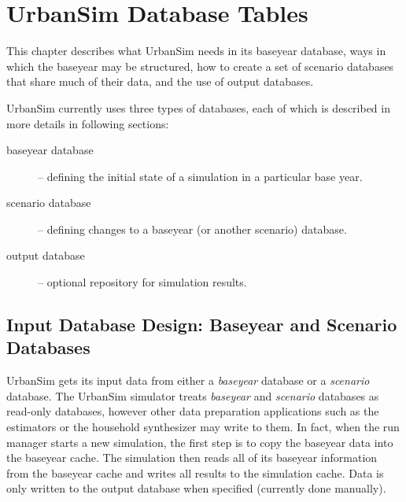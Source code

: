 
\chapter{UrbanSim Database Tables}
\label{chapter:urbansim-database-tables}


This chapter describes what UrbanSim needs in its baseyear database, ways in
which the baseyear may be structured, how to create a set of scenario databases
that share much of their data, and the use of output databases.

UrbanSim currently uses three types of databases, each of which is described in
more details in following sections:

\begin{description}
\item[baseyear database] -- defining the initial state of a simulation in a
particular base year.
\item[scenario database] -- defining changes to a baseyear (or another scenario)
database.
\item[output database] -- optional repository for simulation results.
\end{description}

\section{Input Database Design: Baseyear and Scenario Databases}
\label{urbansim-database-tables-baseyear-scenario-db}

UrbanSim gets its input data from either a \emph{baseyear} database or a
\emph{scenario} database.  The UrbanSim simulator treats \emph{baseyear} and
\emph{scenario} databases as read-only databases, however other data
preparation applications such as the estimators or the household synthesizer
may write to them.  In fact, when the run manager starts a new simulation, the
first step is to copy the baseyear data into the baseyear cache. The
simulation then reads all of its baseyear information from the baseyear cache
and writes all results to the simulation cache.  Data is only written to the
output database when specified (currently done manually).

